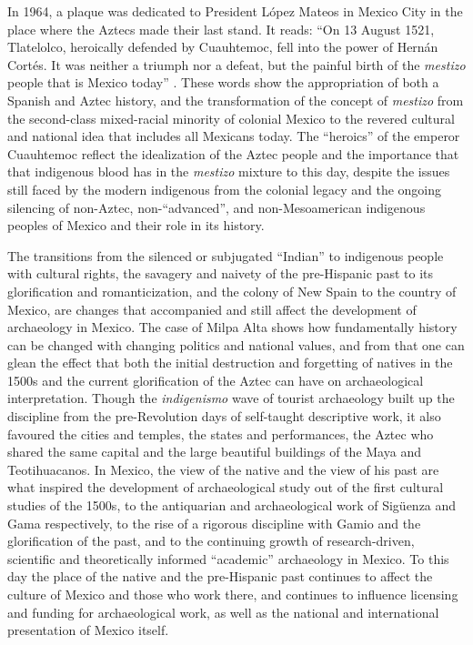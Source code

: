 In 1964, a plaque was dedicated to President López Mateos in Mexico City in the place where the Aztecs made their last stand. It reads: “On 13 August 1521, Tlatelolco, heroically defended by Cuauhtemoc, fell into the power of Hernán Cortés. It was neither a triumph nor a defeat, but the painful birth of the \textit{mestizo} people that is Mexico today” \parencite[234]{Fowler1987}. 
These words show the appropriation of both a Spanish and Aztec history, and the transformation of the concept of \textit{mestizo} from the second-class mixed-racial minority of colonial Mexico to the revered cultural and national idea that includes all Mexicans today. The “heroics” of the emperor Cuauhtemoc reflect the idealization of the Aztec people and the importance that that indigenous blood has in the \textit{mestizo} mixture to this day, despite the issues still faced by the modern indigenous from the colonial legacy and the ongoing silencing of non-Aztec, non-“advanced”, and non-Mesoamerican indigenous peoples of Mexico and their role in its history. 

The transitions from the silenced or subjugated “Indian” to indigenous people with cultural rights, the savagery and naivety of the pre-Hispanic past to its glorification and romanticization, and the colony of New Spain to the country of Mexico, are changes that accompanied and still affect the development of archaeology in Mexico. The case of Milpa Alta shows how fundamentally history can be changed with changing politics and national values, and from that one can glean the effect that both the initial destruction and forgetting of natives in the 1500s and the current glorification of the Aztec can have on archaeological interpretation. 
Though the \textit{indigenismo} wave of tourist archaeology built up the discipline from the pre-Revolution days of self-taught descriptive work, it also favoured the cities and temples, the states and performances, the Aztec who shared the same capital and the large beautiful buildings of the Maya and Teotihuacanos. In Mexico, the view of the native and the view of his past are what inspired the development of archaeological study out of the first cultural studies of the 1500s, to the antiquarian and archaeological work of Sigüenza and Gama respectively, to the rise of a rigorous discipline with Gamio and the glorification of the past, and to the continuing growth of research-driven, scientific and theoretically informed “academic” archaeology in Mexico. To this day the place of the native and the pre-Hispanic past continues to affect the culture of Mexico and those who work there, and continues to influence licensing and funding for archaeological work, as well as the national and international presentation of Mexico itself.


